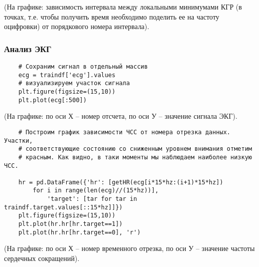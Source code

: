 
(На графике: зависимость интервала между локальными минимумами КГР (в точках, т.е. чтобы получить время необходимо поделить ее на частоту оцифровки) от порядкового номера интервала).

\subsubsection*{Анализ ЭКГ}

\begin{verbatim}
    # Сохраним сигнал в отдельный массив
    ecg = traindf['ecg'].values
    # визуализируем участок сигнала
    plt.figure(figsize=(15,10))
    plt.plot(ecg[:500])
\end{verbatim}


(На графике: по оси Х – номер отсчета, по оси У – значение сигнала ЭКГ).

\begin{verbatim}
    # Построим график зависимости ЧСС от номера отрезка данных. Участки,
    # соответствующие состоянию со сниженным уровнем внимания отметим
    # красным. Как видно, в таки моменты мы наблюдаем наиболее низкую ЧСС.

    hr = pd.DataFrame({'hr': [getHR(ecg[i*15*hz:(i+1)*15*hz]) 
        for i in range(len(ecg)//(15*hz))],
            'target': [tar for tar in traindf.target.values[::15*hz]]})
    plt.figure(figsize=(15,10))
    plt.plot(hr.hr[hr.target==1])
    plt.plot(hr.hr[hr.target==0], 'r')
\end{verbatim}


(На графике: по оси Х – номер временного отрезка, по оси У – значение частоты сердечных сокращений).
